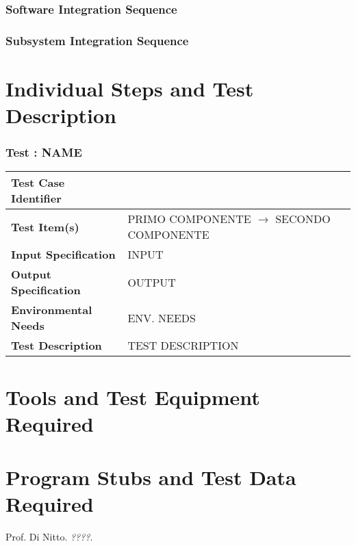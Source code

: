\documentclass[a4paper, 11pt]{article}
\newcommand{\testx}[7]{
	\stepcounter{tc}
	\subsubsection{Test \value{tc}: #1} %
	
	\begin{tabular}{l p{0.7\textwidth}}
    \hline
    \textbf{Test Case Identifier} & \value{tc}\\
    \hline
    \textbf{Test Item(s)} & #2 $\rightarrow$ #3\\
    \hline
    \textbf{Input Specification} & #4\\
    \hline
    \textbf{Output Specification} & #5\\
    \hline
    \textbf{Environmental Needs} & #6\\
    \hline
    \textbf{Test Description} & #7\\
    \hline
	\end{tabular}

}
\begin{document}
\subsubsection{Software Integration Sequence} 
\label{ssub:software_integration_sequence}

\subsubsection{Subsystem Integration Sequence} 
\label{ssub:subsystem_integration_sequence}

\section{Individual Steps and Test Description} 
\label{sub:individual_steps_and_test_description}

\testx{NAME}{PRIMO COMPONENTE}{SECONDO COMPONENTE}{INPUT}{OUTPUT}{ENV. NEEDS}{TEST DESCRIPTION}

\section{Tools and Test Equipment Required} 
\label{sub:tools_and_test_equipment_required}

\section{Program Stubs and Test Data Required} 
\label{sub:program_stubs_and_test_data_required}


\appendix

\clearpage
{}

\begin{thebibliography}{9}
 Prof. Di Nitto.
\emph{????}.
\end{thebibliography}

\vfill

\end{document}
